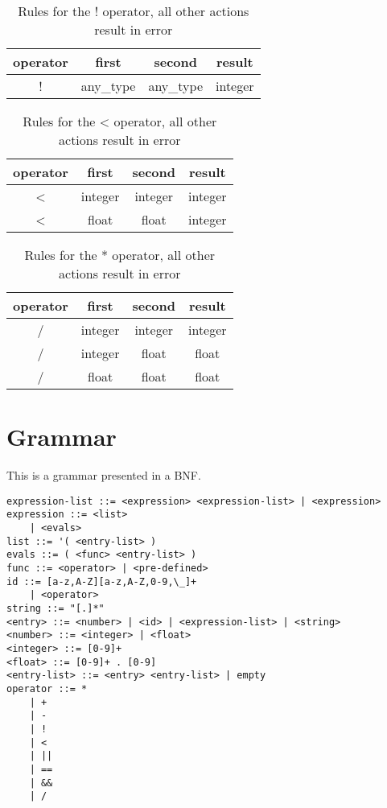 \begin{table}[h!]
\begin{center}
\begin{tabular}{ |c|c|c|c| }
 \hline
 operator & first & second & result   \\ \hline
  ! & any\_type & any\_type & integer \\ \hline
\end{tabular}
\caption{Rules for the ! operator, all other actions result in error}
\end{center}
\end{table}

\begin{table}[h!]
\begin{center}
\begin{tabular}{ |c|c|c|c| }
 \hline
 operator & first & second & result   \\ \hline
  < & integer & integer & integer \\ \hline
  < & float & float & integer \\ \hline
\end{tabular}
\caption{Rules for the < operator, all other actions result in error}
\end{center}
\end{table}

\begin{table}[h!]
\begin{center}
\begin{tabular}{ |c|c|c|c| }
 \hline
 operator & first & second & result   \\ \hline
 / & integer & integer & integer   \\ \hline
 / & integer & float & float\\ 	\hline
 / & float & float & float \\ \hline
\end{tabular}
\caption{Rules for the * operator, all other actions result in error}
\end{center}
\end{table}




\section{Grammar}

This is a grammar presented in a BNF. 


\begin{lstlisting}
expression-list ::= <expression> <expression-list> | <expression>
expression ::= <list> 
	| <evals>
list ::= '( <entry-list> )
evals ::= ( <func> <entry-list> ) 
func ::= <operator> | <pre-defined>
id ::= [a-z,A-Z][a-z,A-Z,0-9,\_]+
	| <operator> 
string ::= "[.]*"
<entry> ::= <number> | <id> | <expression-list> | <string>
<number> ::= <integer> | <float> 
<integer> ::= [0-9]+
<float> ::= [0-9]+ . [0-9]
<entry-list> ::= <entry> <entry-list> | empty
operator ::= *
	| +
	| -
	| !
	| < 
	| ||
	| ==
	| &&
	| /
\end{lstlisting}

